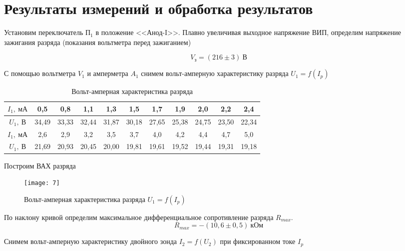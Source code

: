 \section{Результаты измерений и обработка результатов}

Установим переключатель П$_1$ в
положение  <<Анод-I>>. Плавно увеличивая
выходное напряжение ВИП, определим
напряжение зажигания разряда (показания
вольтметра перед зажиганием)

\[
    V_\text{з} = (216\pm 3) \ \text{В}
\]

С помощью вольтметра $V_1$ и
амперметра $A_1$ снимем вольт-амперную
характеристику разряда $U_1 = f(I_p)$

\renewcommand{\arraystretch}{1.1} 
\begin{table}[H]
\centering
\begin{tabular}{|c|c|c|c|c|c|c|c|c|c|c|}
\hline
$I_1, \ \text{мА}$ & 0,5   & 0,8   & 1,1   & 1,3   & 1,5   & 1,7   & 1,9   & 2,0   & 2,2   & 2,4   \\ \hline
$U_1, \ \text{В}$ & 34,49 & 33,33 & 32,44
& 31,87 & 30,18 & 27,65 & 25,38 & 24,75
& 23,50 & 22,34 \\ \hline \hline
$I_1, \ \text{мА}$ & 2,6   & 2,9   & 3,2   & 3,5   & 3,7   & 4,0   & 4,2   & 4,4   & 4,7   & 5,0   \\ \hline
$U_1, \ \text{В}$ & 21,69 & 20,93 & 20,45 & 20,00 & 19,81 & 19,61 & 19,52 & 19,44 & 19,31 & 19,18 \\ \hline
\end{tabular}
\captionsetup{justification=centering}
\caption{Вольт-амперная характеристика
разряда}
\end{table}

Построим ВАХ разряда
\begin{figure}[H]
    \texttt{[image: 7]}
    \captionsetup{justification=centering}
    \caption{Вольт-амперная
    характеристика разряда $U_1 = f(I_p)$}
\end{figure}

По наклону кривой определим максимальное
дифференциальное сопротивление разряда
$R_{max}$.
\[
    R_{max} = -(10,6 \pm 0,5) \ \text{кОм}
\]

Снимем вольт-амперную характеристику
двойного зонда $I_2 = f(U_2)$ при
фиксированном токе $I_p$

\renewcommand{\arraystretch}{1.2} 

